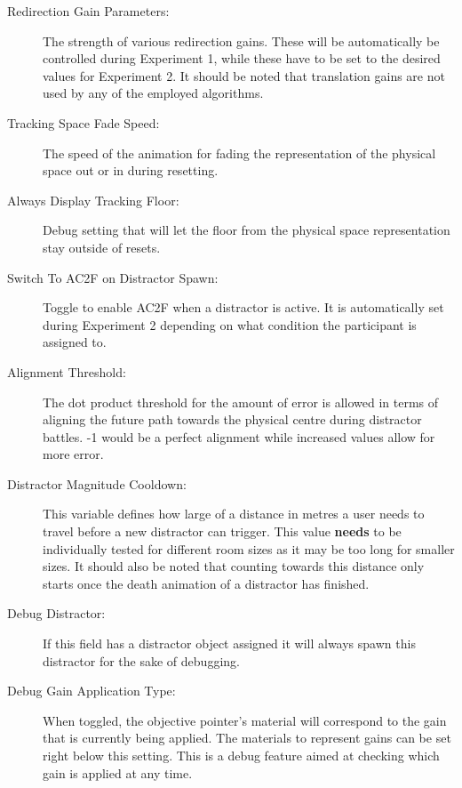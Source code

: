 \begin{description}
   \item[Redirection Gain Parameters:] The strength of various redirection gains. These will be automatically be controlled during Experiment 1, while these have to be set to the desired values for Experiment 2. It should be noted that translation gains are not used by any of the employed algorithms.
   \item[Tracking Space Fade Speed:] The speed of the animation for fading the representation of the physical space out or in during resetting.
   \item[Always Display Tracking Floor:] Debug setting that will let the floor from the physical space representation stay outside of resets.
   \item[Switch To AC2F on Distractor Spawn:] Toggle to enable AC2F when a distractor is active. It is automatically set during Experiment 2 depending on what condition the participant is assigned to. 
   \item[Alignment Threshold:] The dot product threshold for the amount of error is allowed in terms of aligning the future path towards the physical centre during distractor battles. -1 would be a perfect alignment while increased values allow for more error. 
   \item[Distractor Magnitude Cooldown:] This variable defines how large of a distance in metres a user needs to travel before a new distractor can trigger. This value \textbf{needs} to be individually tested for different room sizes as it may be too long for smaller sizes. It should also be noted that counting towards this distance only starts once the death animation of a distractor has finished. 
   \item[Debug Distractor:] If this field has a distractor object assigned it will always spawn this distractor for the sake of debugging. 
   \item[Debug Gain Application Type:] When toggled, the objective pointer's material will correspond to the gain that is currently being applied. The materials to represent gains can be set right below this setting. This is a debug feature aimed at checking which gain is applied at any time. 
\end{description}

